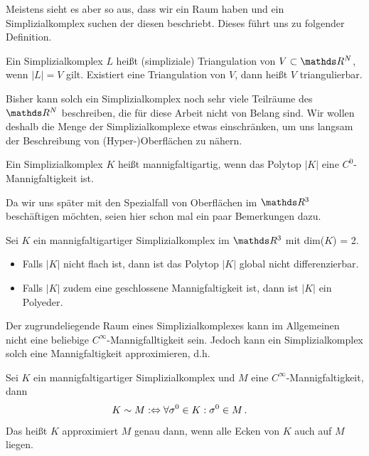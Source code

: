     Meistens sieht es aber so aus, dass wir ein Raum haben und ein Simplizialkomplex suchen der diesen beschriebt.
    Dieses führt uns zu folgender Definition.

    \begin{definition}
      Ein Simplizialkomplex \( L \) heißt (simpliziale) Triangulation von \( V \subset \R^{N} \), wenn \( |L| = V \) gilt.
      Existiert eine Triangulation von \( V \), dann heißt \( V \) triangulierbar.
    \end{definition}

    Bisher kann solch ein Simplizialkomplex noch sehr viele Teilräume des \( \R^{N} \) beschreiben, die für diese Arbeit nicht von Belang sind. 
    Wir wollen deshalb die Menge der Simplizialkomplexe etwas einschränken, um uns langsam der Beschreibung von (Hyper-)Oberflächen zu nähern.

    \begin{definition}
      Ein Simplizialkomplex \( K \) heißt mannigfaltigartig, wenn das Polytop \( |K| \) eine \( C^{0} \)-Mannigfaltigkeit ist.
    \end{definition}

    Da wir uns später mit den Spezialfall von Oberflächen im \( \R^{3} \) beschäftigen möchten, seien hier schon mal ein paar Bemerkungen dazu.
    
    \begin{bemerkung}
      Sei \( K \) ein mannigfaltigartiger Simplizialkomplex im \( \R^{3} \) mit dim(\( K \)) = 2.
      \begin{itemize}
        \item Falls \( |K| \) nicht flach ist, dann ist das Polytop \( |K| \) global nicht differenzierbar.
        \item Falls \( |K| \) zudem eine geschlossene Mannigfaltigkeit ist, dann ist \( |K| \) ein Polyeder.
      \end{itemize}
    \end{bemerkung}

    Der zugrundeliegende Raum eines Simplizialkomplexes kann im Allgemeinen nicht eine beliebige 
    \( C^{\infty} \)-Mannigfalltigkeit sein. Jedoch kann ein Simplizialkomplex solch eine
    Mannigfaltigkeit approximieren, d.h.
    
    \begin{definition}
      \label{defManniApprox}
      Sei \( K \) ein mannigfaltigartiger Simplizialkomplex und \( M \) eine \( C^{\infty} \)-Mannigfaltigkeit, dann
      \begin{align}
        K \sim M &:\Leftrightarrow \forall \sigma^{0}\in K : \sigma^{0} \in M \,\text{.}
      \end{align}
      Das heißt \( K \) approximiert \( M \) genau dann, wenn alle Ecken von \( K \) auch auf \( M \) liegen.
    \end{definition}

